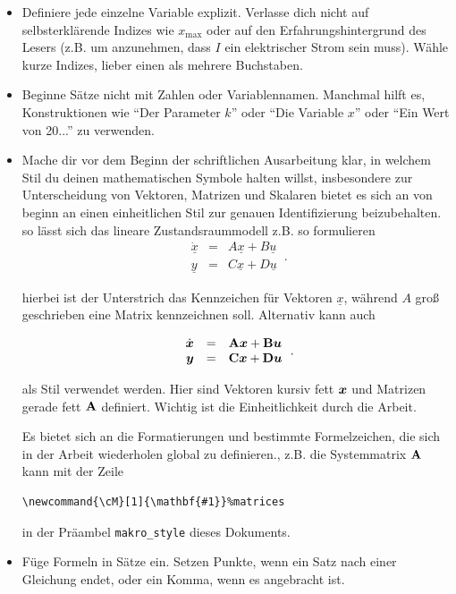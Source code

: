 \begin{itemize}
\item Definiere jede einzelne Variable explizit. Verlasse dich nicht auf selbsterklärende Indizes wie $x_{\mathrm{max}}$ oder auf den Erfahrungshintergrund des Lesers (z.B. um anzunehmen, dass $I$ ein elektrischer Strom sein muss). Wähle kurze Indizes, lieber einen als mehrere Buchstaben. 

\item Beginne Sätze nicht mit Zahlen oder Variablennamen. Manchmal hilft es, Konstruktionen wie ``Der Parameter $k$'' oder ``Die Variable $x$'' oder ``Ein Wert von 20...'' zu verwenden.

\item Mache dir vor dem Beginn der schriftlichen Ausarbeitung klar, in welchem Stil du deinen mathematischen Symbole halten willst, insbesondere zur Unterscheidung von Vektoren, Matrizen und Skalaren bietet es sich an von beginn an einen einheitlichen Stil zur genauen Identifizierung beizubehalten. so lässt sich das lineare Zustandsraummodell z.B. so formulieren
\begin{equation}
\begin{array}{rcl}
\underline{\dot{x}} & = & A\underline{x} + B\underline{u}\\
\underline{y} & = & C\underline{x} + D\underline{u}
\end{array}\,.
\end{equation}

hierbei ist der Unterstrich das Kennzeichen für Vektoren $\underline{x}$, während $A$ groß geschrieben eine Matrix kennzeichnen soll. Alternativ kann auch 

\begin{equation}
\begin{array}{rcl}
\dot{\boldsymbol{x}} & = & \boldsymbol{\mathrm{A}}\boldsymbol{x} + \boldsymbol{\mathrm{B}}\boldsymbol{u}\\
\boldsymbol{y} & = & \boldsymbol{\mathrm{C}}\boldsymbol{x} + \boldsymbol{\mathrm{D}}\boldsymbol{u}
\end{array}\,.
\end{equation}

als Stil verwendet werden. Hier sind Vektoren kursiv fett $\boldsymbol{x}$ und Matrizen gerade fett $\boldsymbol{\mathrm{A}}$ definiert. Wichtig ist die Einheitlichkeit durch die Arbeit.

Es bietet sich an die Formatierungen und bestimmte Formelzeichen, die sich in der Arbeit wiederholen global zu definieren., z.B. die Systemmatrix $\boldsymbol{\mathrm{A}}$ kann mit der Zeile
\begin{verbatim}
\newcommand{\cM}[1]{\mathbf{#1}}%matrices
\end{verbatim}
 in der Präambel \texttt{makro\_style} dieses Dokuments.

\item Füge Formeln in Sätze ein. Setzen Punkte, wenn ein Satz nach einer Gleichung endet, oder ein Komma, wenn es angebracht ist. 
\end{itemize}

